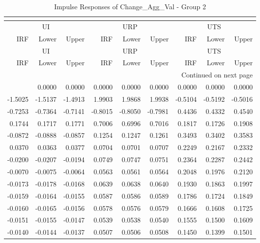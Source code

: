 \begin{longtable}{rrrrrrrrr}
\caption{Impulse Responses of Change_Agg_Val - Group 2}\\
\label{tab:cav_irf_group2}\\
\toprule
\multicolumn{3}{c}{UI} & \multicolumn{3}{c}{URP} & \multicolumn{3}{c}{UTS} \\
IRF & Lower & Upper & IRF & Lower & Upper & IRF & Lower & Upper \\
\midrule
\endfirsthead
\toprule
\multicolumn{3}{c}{UI} & \multicolumn{3}{c}{URP} & \multicolumn{3}{c}{UTS} \\
IRF & Lower & Upper & IRF & Lower & Upper & IRF & Lower & Upper \\
\midrule
\endhead
\midrule
\multicolumn{9}{r}{Continued on next page} \\
\midrule
\endfoot
\bottomrule
\endlastfoot
0.0000 & 0.0000 & 0.0000 & 0.0000 & 0.0000 & 0.0000 & 0.0000 & 0.0000 & 0.0000 \\
-1.5025 & -1.5137 & -1.4913 & 1.9903 & 1.9868 & 1.9938 & -0.5104 & -0.5192 & -0.5016 \\
-0.7253 & -0.7364 & -0.7141 & -0.8015 & -0.8050 & -0.7981 & 0.4436 & 0.4332 & 0.4540 \\
0.1744 & 0.1717 & 0.1771 & 0.7006 & 0.6996 & 0.7016 & 0.1817 & 0.1726 & 0.1908 \\
-0.0872 & -0.0888 & -0.0857 & 0.1254 & 0.1247 & 0.1261 & 0.3493 & 0.3402 & 0.3583 \\
0.0370 & 0.0363 & 0.0377 & 0.0704 & 0.0701 & 0.0707 & 0.2249 & 0.2167 & 0.2332 \\
-0.0200 & -0.0207 & -0.0194 & 0.0749 & 0.0747 & 0.0751 & 0.2364 & 0.2287 & 0.2442 \\
-0.0070 & -0.0075 & -0.0064 & 0.0563 & 0.0561 & 0.0564 & 0.2048 & 0.1976 & 0.2120 \\
-0.0173 & -0.0178 & -0.0168 & 0.0639 & 0.0638 & 0.0640 & 0.1930 & 0.1863 & 0.1997 \\
-0.0159 & -0.0164 & -0.0155 & 0.0587 & 0.0586 & 0.0589 & 0.1786 & 0.1724 & 0.1849 \\
-0.0160 & -0.0165 & -0.0156 & 0.0578 & 0.0576 & 0.0579 & 0.1666 & 0.1608 & 0.1725 \\
-0.0151 & -0.0155 & -0.0147 & 0.0539 & 0.0538 & 0.0540 & 0.1555 & 0.1500 & 0.1609 \\
-0.0140 & -0.0144 & -0.0137 & 0.0507 & 0.0506 & 0.0508 & 0.1450 & 0.1399 & 0.1501 \\
\end{longtable}